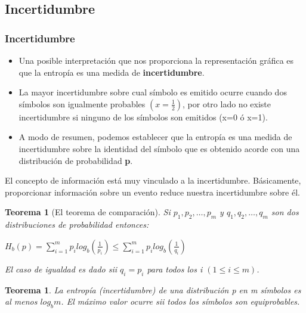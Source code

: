 \documentclass{beamer}
\newtheorem{teorema} [Teorema] {Teorema}
\begin{document}
\subsection{Incertidumbre}

\begin{frame}  \frametitle{Incertidumbre}\small

\begin{itemize}
\item Una  posible interpretación que nos proporciona la representación gráfica es que la entropía es una medida de \textbf{incertidumbre}. 


\item La mayor incertidumbre sobre cual símbolo es emitido ocurre cuando dos símbolos son igualmente probables $(x=\frac{1}{2})$, por otro lado no existe incertidumbre si ninguno de los símbolos son emitidos (x=0 ó x=1). 

\item A modo de resumen, podemos establecer que la entropía es una medida de incertidumbre sobre la identidad del símbolo que es obtenido acorde con una distribución de probabilidad \textbf{p}. 





\end{itemize}

\end{frame} 

\begin{frame}  \small


El concepto de información está muy vinculado a la incertidumbre. Básicamente, proporcionar información sobre un evento reduce nuestra incertidumbre sobre él. 


\begin{teorema}[El teorema de comparación]
Si $p_1, p_2, \ldots , p_m$ y $q_1, q_2, \ldots , q_m$ son dos distribuciones de probabilidad entonces:

\begin{center}
$H_b(p) =  \sum^{m}_{i=1} p_i log_b(\frac{1}{p_i}) \leq \sum^{m}_{i=1} p_i log_b(\frac{1}{q_i}) $
\end{center}

El caso de igualdad es dado sii $q_i=p_i$ para todos los i $(1\leq i \leq m)$.

\end{teorema}



\begin{teorema}
La entropía (incertidumbre) de una distribución p en m símbolos es al menos $log_b m$. 
El máximo valor ocurre sii todos los símbolos son equiprobables.
\end{teorema}


\end{frame} 
\end{document}
